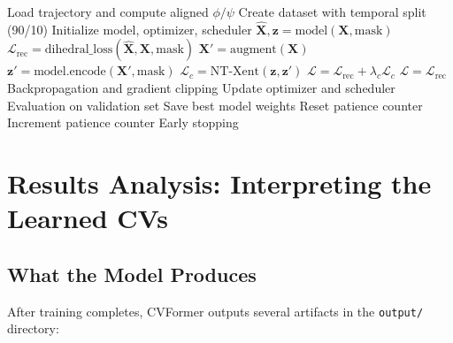 \documentclass[12pt,a4paper]{article}
\begin{document}
\begin{algorithm}[H]
\caption{Main Training Loop}
\begin{algorithmic}[1]
\STATE Load trajectory and compute aligned $\phi/\psi$
\STATE Create dataset with temporal split (90/10)
\STATE Initialize model, optimizer, scheduler
        \STATE $\hat{\mathbf{X}}, \mathbf{z} = \text{model}(\mathbf{X}, \text{mask})$
        \STATE $\mathcal{L}_{\text{rec}} = \text{dihedral\_loss}(\hat{\mathbf{X}}, \mathbf{X}, \text{mask})$
            \STATE $\mathbf{X}' = \text{augment}(\mathbf{X})$
            \STATE $\mathbf{z}' = \text{model.encode}(\mathbf{X}', \text{mask})$
            \STATE $\mathcal{L}_c = \text{NT-Xent}(\mathbf{z}, \mathbf{z}')$
            \STATE $\mathcal{L} = \mathcal{L}_{\text{rec}} + \lambda_c \mathcal{L}_c$
        \ELSE
            \STATE $\mathcal{L} = \mathcal{L}_{\text{rec}}$
        \ENDIF
        \STATE Backpropagation and gradient clipping
        \STATE Update optimizer and scheduler
    \ENDFOR
    \STATE Evaluation on validation set
        \STATE Save best model weights
        \STATE Reset patience counter
    \ELSE
        \STATE Increment patience counter
    \ENDIF
        \STATE Early stopping
    \ENDIF
\ENDFOR
\end{algorithmic}
\end{algorithm}


\section{Results Analysis: Interpreting the Learned CVs}

\subsection{What the Model Produces}

After training completes, CVFormer outputs several artifacts in the \texttt{output/} directory:
\end{document}
